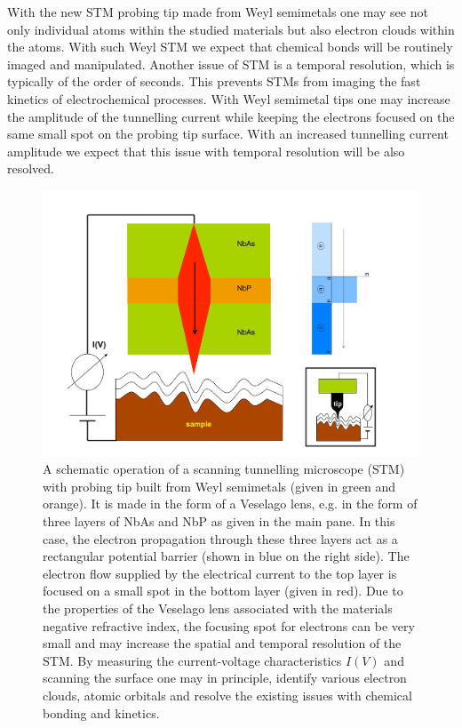 \documentclass[prb,twocolumn,aps,superscriptaddress,showpacs,floatfix]{revtex4}
\begin{document}
	With the new STM probing tip made from Weyl semimetals one may see not only individual atoms within the studied materials but also electron clouds within the atoms. With such Weyl STM we expect that chemical bonds will be routinely imaged and manipulated. Another issue of STM is a temporal resolution, which is typically of the order of seconds. This prevents STMs from imaging the fast kinetics of electrochemical processes. With Weyl semimetal tips one may increase the amplitude of the tunnelling current while keeping the electrons focused on the same small spot on the probing tip surface. With an increased tunnelling current amplitude we expect that this issue with temporal resolution will be also resolved.

\begin{figure}
	\centerline{\includegraphics[scale=0.33]{weyl-tip1.pdf}}
	\caption{A schematic operation of a scanning tunnelling microscope (STM) with probing tip built from Weyl semimetals (given in green and orange). It is made in the form of a Veselago lens, e.g. in the form of three layers of NbAs and NbP as given in the main pane. In this case, the electron propagation through these three layers act as a rectangular potential barrier (shown in blue on the right side). The electron flow supplied by the electrical current to the top layer is focused on a small spot in the bottom layer (given in red). Due to the properties of the Veselago lens associated with the materials negative refractive index, the focusing spot for electrons can be very small and may increase the spatial and temporal resolution of the STM. By measuring the current-voltage characteristics $I(V)$ and scanning the surface one may in principle, identify various electron clouds, atomic orbitals and resolve the existing issues with chemical bonding and kinetics.}
	\label{tip}
\end{figure}
\end{document}
